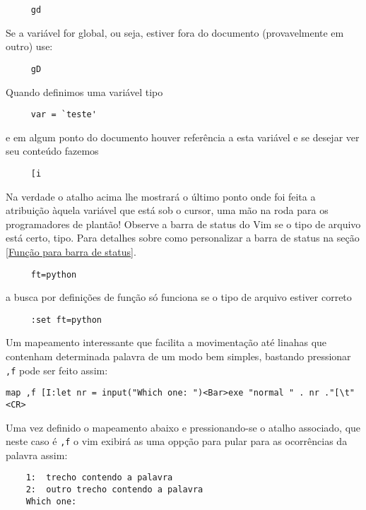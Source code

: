 \begin{verbatim}
     gd
\end{verbatim}

Se a variável for global, ou seja, estiver fora do documento
(provavelmente em outro) use:

\begin{verbatim}
     gD
\end{verbatim}

Quando definimos uma variável tipo

\begin{verbatim}
     var = `teste'
\end{verbatim}

e em algum ponto do documento houver referência a esta variável e se
desejar ver seu conteúdo fazemos

\begin{verbatim}
     [i
\end{verbatim}

Na verdade o atalho acima lhe mostrará o último ponto onde foi feita a
atribuição àquela variável que está sob o cursor, uma mão na roda para os
programadores de plantão!  {\Large {}} Observe a  barra de status do
Vim se o tipo de arquivo está certo, tipo. Para detalhes sobre como
personalizar a barra de status na seção \ref{Função para barra de status}.

\begin{verbatim}
     ft=python
\end{verbatim}

a busca por definições de função só funciona se o tipo de arquivo
estiver correto

\begin{verbatim}
     :set ft=python
\end{verbatim}

{\Large {}} Um mapeamento interessante que facilita a movimentação até
linahas  que contenham determinada palavra de um modo bem simples, bastando
pressionar \verb|,f| pode ser feito assim:

\begin{verbatim}
map ,f [I:let nr = input("Which one: ")<Bar>exe "normal " . nr ."[\t"<CR>
\end{verbatim}

Uma vez definido o mapeamento abaixo e pressionando-se o atalho associado, que
neste caso é \verb|,f| o vim exibirá as uma oppção para pular para as ocorrências 
da palavra assim:

\begin{verbatim}
    1:  trecho contendo a palavra
    2:  outro trecho contendo a palavra
    Which one: 
\end{verbatim}


